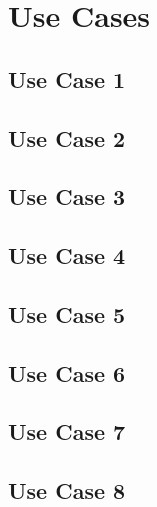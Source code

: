 \newpage
\section{Use Cases}

\subsection{Use Case 1}


\newpage

\subsection{Use Case 2}


\newpage

\subsection{Use Case 3}


\newpage

\subsection{Use Case 4}


\newpage

\subsection{Use Case 5}


\newpage

\subsection{Use Case 6}


\newpage

\subsection{Use Case 7}


\newpage

\subsection{Use Case 8}

